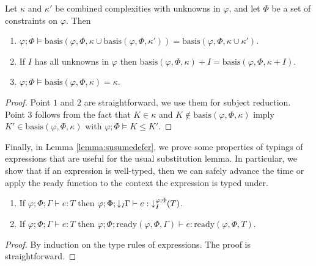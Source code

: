 \begin{lemma}\label{lemma:basisdefer}
Let $\kappa$ and $\kappa'$ be combined complexities with unknowns in $\varphi$, and let $\Phi$ be a set of constraints on $\varphi$. Then 
\begin{enumerate}
    \item $\varphi;\Phi\vDash \text{basis}(\varphi,\Phi, \kappa \cup \text{basis}(\varphi,\Phi,\kappa'))=\text{basis}(\varphi,\Phi,\kappa\cup\kappa')$.
    \item If $I$ has all unknowns in $\varphi$ then $\text{basis}(\varphi,\Phi,\kappa)+I = \text{basis}(\varphi,\Phi,\kappa+I)$.
    \item $\varphi;\Phi\vDash \text{basis}(\varphi,\Phi,\kappa) = \kappa$.
\end{enumerate}
\begin{proof}
    Point $1$ and $2$ are straightforward, we use them for subject reduction. Point $3$ follows from the fact that $K\in\kappa$ and $K\notin\text{basis}(\varphi,\Phi,\kappa)$ imply $K'\in\text{basis}(\varphi,\Phi,\kappa)$ with $\varphi;\Phi\vDash K \leq K'$. 
\end{proof}
\end{lemma}
%
Finally, in Lemma \ref{lemma:susumedefer}, we prove some properties of typings of expressions that are useful for the usual substitution lemma. In particular, we show that if an expression is well-typed, then we can safely advance the time or apply the ready function to the context the expression is typed under.
%
\begin{lemma}\label{lemma:susumedefer}\text{ }
\begin{enumerate}
    \item If $\varphi;\Phi;\Gamma\vdash e : T$ then $\varphi;\Phi;\downarrow_I\!\!\Gamma\vdash e :\; \susume{T}{\varphi}{\Phi}{I}$. 
    \item If $\varphi;\Phi;\Gamma\vdash e : T$ then $\varphi;\Phi;\text{ready}(\varphi,\Phi,\Gamma)\vdash e : \text{ready}(\varphi,\Phi,T)$.
\end{enumerate}
\begin{proof} By induction on the type rules of expressions. The proof is straightforward.
\end{proof}
\end{lemma}
%
